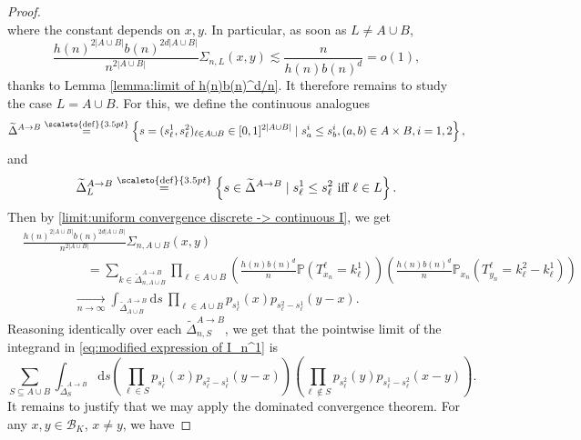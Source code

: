 \documentclass[12pt]{article}
\newcommand{\PP}{\mathbb P}
\newcommand{\1}{\mathds{1}}
\renewcommand{\d}{\mathrm d}
\newcommand{\eqdef}{\stackrel{\scaleto{\mathrm{def}}{3.5pt}}{=}}
\numberwithin{equation}{section}
\begin{document}
\begin{proof}
\begin{equation*}
    \end{equation*}
    where the constant depends on $x,y$. In particular, as soon as $L\ne A\cup B$,
    \begin{equation*}
        \frac{h(n)^{2|A\cup B|}b(n)^{2d|A\cup B|}}{n^{2|A\cup B|}}\Sigma_{n,L}(x,y)\lesssim \frac{n}{h(n)b(n)^d}=o(1),
    \end{equation*}
    thanks to Lemma \ref{lemma:limit of h(n)b(n)^d/n}. It therefore remains to study the case $L=A\cup B$. For this, we define the continuous analogues
    \begin{equation*}
        \widetilde\Delta^{A\rightarrow B}\eqdef\left\{s=(s_\ell^1,s_\ell^2)_{\ell\in A\cup B}\in[0,1]^{2|A\cup B|}\mid s_a^i\le s_b^i, (a,b)\in A\times B,i=1,2\right\},
    \end{equation*}
    and
    \begin{equation*}
        \widetilde\Delta_{L}^{A\rightarrow B}\eqdef\left\{s\in\widetilde\Delta^{A\rightarrow B}\mid s_\ell^1\le s_\ell^2\text{ iff }\ell\in L\right\}.
    \end{equation*}
    Then by \eqref{limit:uniform convergence discrete -> continuous I}, we get
    \begin{align*}
        &\frac{h(n)^{2|A\cup B|}b(n)^{2d|A\cup B|}}{n^{2|A\cup B|}}\Sigma_{n,A\cup B}(x,y)\\
        &\hspace{5em}=\sum_{k\in\widetilde\Delta_{n,A\cup B}^{A\rightarrow B}}\prod_{\ell\in A\cup B}\left(\frac{h(n)b(n)^d}{n}\PP\left(T_{x_n}^\ell=k_\ell^1\right)\right)\left(\frac{h(n)b(n)^d}{n}\PP_{x_n}\left(T_{y_n}^\ell=k_\ell^2-k_\ell^1\right)\right)\\
        &\hspace{4em}\underset{n\rightarrow\infty}{\longrightarrow}\int_{\widetilde \Delta_{A\cup B}^{A\rightarrow B}}\d s\ \prod_{\ell\in A\cup B}p_{s_\ell^1}(x)p_{s_\ell^2-s_\ell^1}(y-x).
    \end{align*}
    Reasoning identically over each $\widetilde \Delta_{n,S}^{A\rightarrow B}$, we get that the pointwise limit of the integrand in \eqref{eq:modified expression of I_n^1} is 
    \begin{equation*}
        \sum_{S\subseteq A\cup B}\int_{\widetilde\Delta_S^{A\rightarrow B}}\d s\left(\prod_{\ell\in S}p_{s_\ell^1}(x) p_{s_\ell^2-s_\ell^1}(y-x)\right)\left(\prod_{\ell\notin S}p_{s_\ell^2}(y) p_{s_\ell^1-s_\ell^2}(x-y)\right).
    \end{equation*}
    It remains to justify that we may apply the dominated convergence theorem. For any $x,y\in\mathcal B_K$, $x\ne y$, we have

\end{proof}
\end{document}
